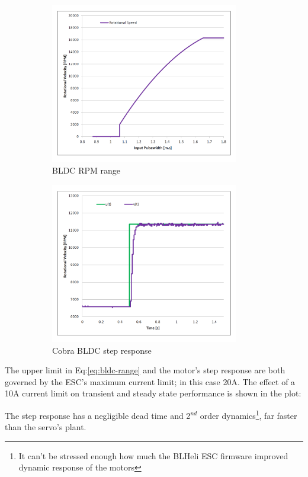 \begin{figure}[hbtp]
\begin{subfigure}{0.5\textwidth}
\centering
\includegraphics[width=0.9\textwidth]{graphs/bldc-range}
\caption{BLDC RPM range}
\label{fig:bldc-range}
\end{subfigure}
\begin{subfigure}{0.5\textwidth}
\centering
\includegraphics[width=0.9\textwidth]{graphs/BLDC-step}
\caption{Cobra BLDC step response}
\label{fig:bldc-step}
\end{subfigure}
\caption{}
\end{figure}
The upper limit in Eq:\ref{eq:bldc-range} and the motor's step response are both governed by the ESC's maximum current limit; in this case 20A. The effect of a 10A current limit on transient and steady state performance is shown in the plot:

 The step response has a negligible dead time and 2$^{nd}$ order dynamics\footnote{It can't be stressed enough how much the BLHeli ESC firmware improved dynamic response of the motors}, far faster than the servo's plant.
